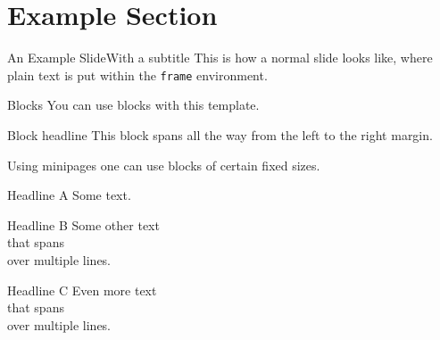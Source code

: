 %
%
%

\section{Example Section}
\begin{frame}[t]{An Example Slide}{With a subtitle}
This is how a normal slide looks like, where plain text is put within the \texttt{frame} environment.
\end{frame}
%
%
%
%
%
\begin{frame}[t]{Blocks}{}
You can use blocks with this template.
\begin{block}{Block headline}
This block spans all the way from the left to the right margin.
\end{block}
Using minipages one can use blocks of certain fixed sizes.\\
%
\noindent%
\begin{minipage}[t]{0.45\textwidth}
\begin{block}{Headline A}
Some text.
\end{block}
\end{minipage}
\hfill%
\begin{minipage}[t]{0.2\textwidth}
\begin{block}{Headline B}
Some other text\\
that spans\\
over multiple lines.
\end{block}
\end{minipage}
\hfill%
\begin{minipage}[t]{0.2\textwidth}
\begin{block}{Headline C}
Even more text\\
that spans\\
over multiple lines.
\end{block}
\end{minipage}
\end{frame}
